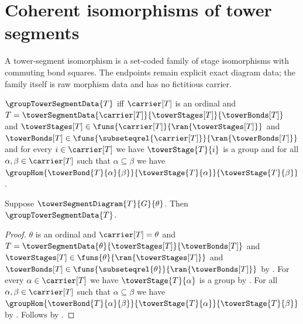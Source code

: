 


\section{Coherent isomorphisms of tower segments}

A tower-segment isomorphism is a set-coded family of stage isomorphisms with
commuting bond squares.  The endpoints remain explicit exact diagram data; the
family itself is raw morphism data and has no fictitious carrier.

\begin{definition}\label{group_tower_segment_data}
    $\groupTowerSegmentData{T}$ iff
        $\carrier[T]$ is an ordinal and
        $T=\towerSegmentData{\carrier[T]}{\towerStages[T]}{\towerBonds[T]}$ and
        $\towerStages[T]\in
            \funs{\carrier[T]}{\ran{\towerStages[T]}}$ and
        $\towerBonds[T]\in
            \funs{\subseteqrel{\carrier[T]}}{\ran{\towerBonds[T]}}$ and
        for every $i\in\carrier[T]$ we have
            $\towerStage{T}{i}$ is a group and
        for all $\alpha,\beta\in\carrier[T]$ such that
            $\alpha\subseteq\beta$ we have
            $\groupHom{\towerBond{T}{\alpha}{\beta}}
                {\towerStage{T}{\alpha}}{\towerStage{T}{\beta}}$.
\end{definition}

\begin{proposition}\label{tower_segment_diagram_is_group_data}
    Suppose $\towerSegmentDiagram{T}{G}{\theta}$.
    Then $\groupTowerSegmentData{T}$.
\end{proposition}
\begin{proof}
    $\theta$ is an ordinal and $\carrier[T]=\theta$ and
        $T=\towerSegmentData{\theta}{\towerStages[T]}{\towerBonds[T]}$ and
        $\towerStages[T]\in\funs{\theta}{\ran{\towerStages[T]}}$ and
        $\towerBonds[T]\in
            \funs{\subseteqrel{\theta}}{\ran{\towerBonds[T]}}$ by
        .
    For every $\alpha\in\carrier[T]$ we have
        $\towerStage{T}{\alpha}$ is a group by
        .
    For all $\alpha,\beta\in\carrier[T]$ such that
        $\alpha\subseteq\beta$ we have
        $\groupHom{\towerBond{T}{\alpha}{\beta}}
            {\towerStage{T}{\alpha}}{\towerStage{T}{\beta}}$ by
        .
    Follows by .
\end{proof}

